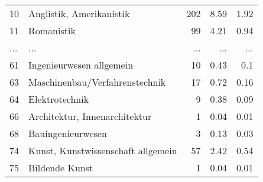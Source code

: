 \begin{longtable}{lXrrr}
        10 & \multicolumn{1}{X}{Anglistik, Amerikanistik} & %
          \num{202} &
          \num[round-mode=places,round-precision=2]{8.59} &
          \num[round-mode=places,round-precision=2]{1.92} \\
        11 & \multicolumn{1}{X}{Romanistik} & %
          \num{99} &
          \num[round-mode=places,round-precision=2]{4.21} &
          \num[round-mode=places,round-precision=2]{0.94} \\
       ... & ... & ... & ... & ... \\
        61 & \multicolumn{1}{X}{Ingenieurwesen allgemein} & %
          \num{10} &
          \num[round-mode=places,round-precision=2]{0.43} &
          \num[round-mode=places,round-precision=2]{0.1} \\

        63 & \multicolumn{1}{X}{Maschinenbau/Verfahrenstechnik} & %
          \num{17} &
          \num[round-mode=places,round-precision=2]{0.72} &
          \num[round-mode=places,round-precision=2]{0.16} \\

        64 & \multicolumn{1}{X}{Elektrotechnik} & %
          \num{9} &
          \num[round-mode=places,round-precision=2]{0.38} &
          \num[round-mode=places,round-precision=2]{0.09} \\

        66 & \multicolumn{1}{X}{Architektur, Innenarchitektur} & %
          \num{1} &
          \num[round-mode=places,round-precision=2]{0.04} &
          \num[round-mode=places,round-precision=2]{0.01} \\

        68 & \multicolumn{1}{X}{Bauingenieurwesen} & %
          \num{3} &
          \num[round-mode=places,round-precision=2]{0.13} &
          \num[round-mode=places,round-precision=2]{0.03} \\

        74 & \multicolumn{1}{X}{Kunst, Kunstwissenschaft allgemein} & %
          \num{57} &
          \num[round-mode=places,round-precision=2]{2.42} &
          \num[round-mode=places,round-precision=2]{0.54} \\

        75 & \multicolumn{1}{X}{Bildende Kunst} & %
          \num{1} &
          \num[round-mode=places,round-precision=2]{0.04} &
          \num[round-mode=places,round-precision=2]{0.01} \\


\end{longtable}
